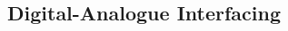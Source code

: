 \subsection{Digital-Analogue Interfacing}%
\label{sub:digital-analogue-interfacing}

\begin{multicols}{2}


\end{multicols}

